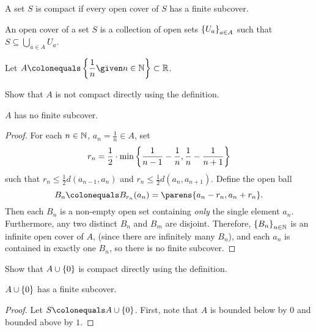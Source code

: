 \begin{problem}
  \begin{definition}
    A set $S$ is compact if every open cover of $S$ has a finite subcover.
  \end{definition}

  \begin{definition}
    An open cover of a set $S$ is a collection of open sets $\left\{U_a\right\}_{a \in A}$ such that $S \subseteq \bigcup_{a \in A}{U_a}$.
  \end{definition}

  Let $\displaystyle A \colonequals \set{\frac{1}{n} \given n \in \N} \subset \R$.
  \begin{enumroman}
    \item Show that $A$ is not compact directly using the definition.
      \begin{answer}
        \begin{claim}
          $A$ has no finite subcover.
          \begin{proof}
            For each $n \in \mathbb{N}$, $\displaystyle a_n = \frac{1}{n} \in A$,
            set \[ r_n = \frac{1}{2} \cdot \min \left\{ \frac{1}{n-1} - \frac{1}{n}, \frac{1}{n} - \frac{1}{n+1}\right\} \]
            such that $r_n \leq \frac{1}{2} d(a_{n-1}, a_n)$ and $r_n \leq \frac{1}{2} d(a_n, a_{n+1})$.
            Define the open ball
            \[ B_n \colonequals B_{r_n}(a_n) = \parens{a_n - r_n, a_n + r_n}. \]
            Then each $B_n$ is a non-empty open set containing \emph{only} the single element $a_n$.
            Furthermore, any two distinct $B_n$ and $B_m$ are disjoint.
            Therefore, $\left\{B_n\right\}_{n \in \mathbb{N}}$ is an infinite open cover of $A$,
            (since there are infinitely many $B_n$),
            and each $a_n$ is contained in exactly one $B_n$,
            so there is no finite subcover.
          \end{proof}
        \end{claim}
      \end{answer}
    \item Show that $A \cup \left\{0\right\}$ is compact directly using the definition.
      \begin{answer}
        \begin{claim}
          $A \cup \left\{0\right\}$ has a finite subcover.
          \begin{proof}
            Let $S \colonequals A \cup \set{0}$.
            First, note that $A$ is bounded below by $0$
            and bounded above by $1$.

\end{proof}
\end{claim}
\end{answer}
\end{enumroman}
\end{problem}
